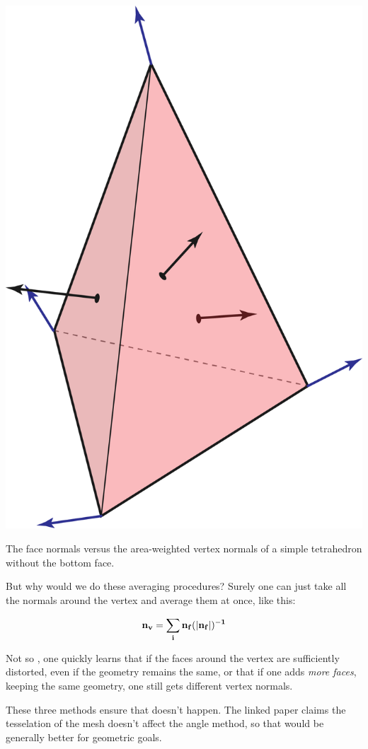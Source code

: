 \begin{marginfigure}
    \centering
    \includegraphics[width=0.8\linewidth]{images/pervertex.png}
    \caption{The face normals versus the area-weighted vertex normals
    of a simple tetrahedron without the bottom face.}
\end{marginfigure}

\spa

But why would we do these averaging procedures? Surely one can
just take all the normals around the vertex and average them
at once, like this:

\begin{align*}
    \bf{n}_v = \sum_i \bf{n}_f 
    (|\bf{n}_f|)^{-1}
\end{align*}

Not so \cite{vertex1}, one quickly
learns that if the faces around the vertex are sufficiently
distorted, even if the geometry remains the same, or that if one
adds \emph{more faces}, keeping the same geometry, one still gets
different vertex normals.

\spa

These three methods ensure that doesn't happen. The linked
paper claims the tesselation of the mesh doesn't affect the angle
method, so that would be generally better for geometric goals.

